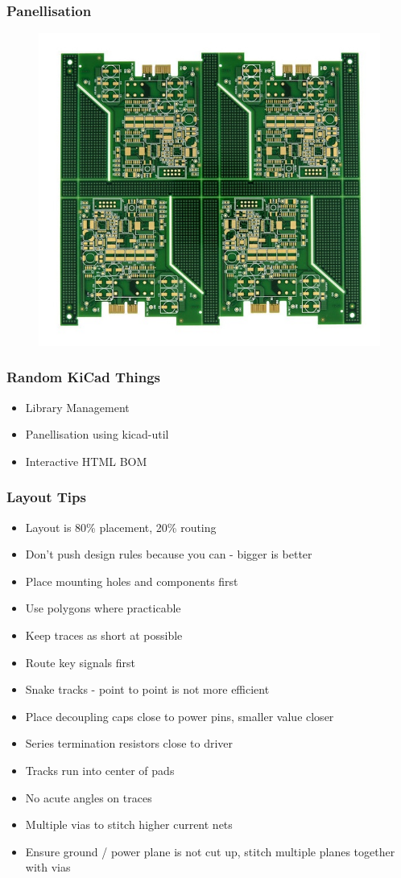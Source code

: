 \documentclass[t]{beamer}
\begin{document}
\begin{frame}
	\frametitle{Panellisation}
	\begin{figure}
		\includegraphics[width=0.7\linewidth]{panel.jpg}
	\end{figure}
\end{frame}
\begin{frame}
	\frametitle{Random KiCad Things}
	\begin{itemize}
		\item Library Management
		\item Panellisation using kicad-util
		\item Interactive HTML BOM
	\end{itemize}
\end{frame}
\begin{frame}
	\frametitle{Layout Tips}
	\begin{itemize}
		\item Layout is 80\% placement, 20\% routing
		\item Don't push design rules because you can - bigger is better
		\item Place mounting holes and components first
		\item Use polygons where practicable 
		\item Keep traces as short at possible
		\item Route key signals first
		\item Snake tracks - point to point is not more efficient
		\item Place decoupling caps close to power pins, smaller value closer
		\item Series termination resistors close to driver
		\item Tracks run into center of pads
		\item No acute angles on traces
		\item Multiple vias to stitch higher current nets
		\item Ensure ground / power plane is not cut up, stitch multiple planes together with vias
	\end{itemize}
\end{frame}
\end{document}
